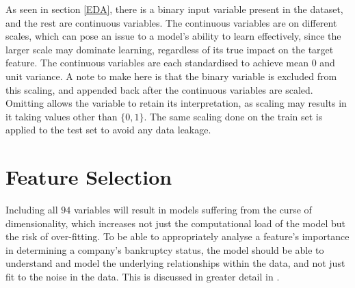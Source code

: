 \documentclass[11pt]{article}
\begin{document}
As seen in section \ref{EDA}, there is a binary input variable present in the dataset, and the rest are continuous variables. The continuous variables are on different scales, which can pose an issue to a model's ability to learn effectively, since the larger scale may dominate learning, regardless of its true impact on the target feature. The continuous variables are each standardised to achieve mean $0$ and unit variance. A note to make here is that the binary variable is excluded from this scaling, and appended back after the continuous variables are scaled. Omitting allows the variable to retain its interpretation, as scaling may results in it taking values other than $\{0,1\}$. The same scaling done on the train set is applied to the test set to avoid any data leakage.\\ 

\section{Feature Selection} \label{FeatureSelection}

Including all $94$ variables will result in models suffering from the curse of dimensionality, which increases not just the computational load of the model but the risk of over-fitting. To be able to appropriately analyse a feature's importance in determining a company's bankruptcy status, the model should be able to understand and model the underlying relationships within the data, and not just fit to the noise in the data. This is discussed in greater detail in  \cite{feature_selection_curse_of_dim}. \\
\end{document}
